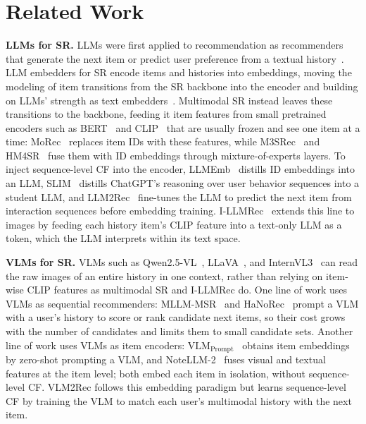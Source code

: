 \section{Related Work}
\label{sec:related}
\noindent\textbf{LLMs for SR.}
LLMs were first applied to recommendation as recommenders that generate the next item or predict user preference from a textual history~\cite{p5,tallrec}.
LLM embedders for SR encode items and histories into embeddings, moving the modeling of item transitions from the SR backbone into the encoder and building on LLMs' strength as text embedders~\cite{llmret2}.
Multimodal SR instead leaves these transitions to the backbone, feeding it item features from small pretrained encoders such as BERT~\cite{bert} and CLIP~\cite{clip} that are usually frozen and see one item at a time: MoRec~\cite{mmrec1} replaces item IDs with these features, while M3SRec~\cite{modrec_m3srec} and HM4SR~\cite{modrec_hm4sr} fuse them with ID embeddings through mixture-of-experts layers.
To inject sequence-level CF into the encoder, LLMEmb~\cite{llmemb} distills ID embeddings into an LLM, SLIM~\cite{slim} distills ChatGPT's reasoning over user behavior sequences into a student LLM, and LLM2Rec~\cite{llm2rec} fine-tunes the LLM to predict the next item from interaction sequences before embedding training.
I-LLMRec~\cite{illmrec} extends this line to images by feeding each history item's CLIP feature into a text-only LLM as a token, which the LLM interprets within its text space.

\vspace{+0.1cm}
\noindent\textbf{VLMs for SR.}
VLMs such as Qwen2.5-VL~\cite{qwen2.5-vl}, LLaVA~\cite{llava}, and InternVL3~\cite{internvl3} can read the raw images of an entire history in one context, rather than relying on item-wise CLIP features as multimodal SR and I-LLMRec do.
One line of work uses VLMs as sequential recommenders: MLLM-MSR~\cite{mllmmsr} and HaNoRec~\cite{hanorec} prompt a VLM with a user's history to score or rank candidate next items, so their cost grows with the number of candidates and limits them to small candidate sets.
Another line of work uses VLMs as item encoders: $\text{VLM}_{\text{Prompt}}$~\cite{vlm_prompt} obtains item embeddings by zero-shot prompting a VLM, and NoteLLM-2~\cite{notellm2} fuses visual and textual features at the item level; both embed each item in isolation, without sequence-level CF.
VLM2Rec follows this embedding paradigm but learns sequence-level CF by training the VLM to match each user's multimodal history with the next item.


